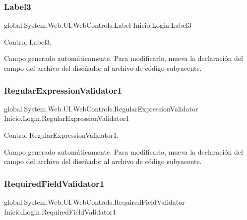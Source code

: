 \subsubsection{\texorpdfstring{Label3}{Label3}}
{\footnotesize\ttfamily global.\+System.\+Web.\+U\+I.\+Web\+Controls.\+Label Inicio.\+Login.\+Label3\hspace{0.3cm}{\ttfamily [protected]}}



Control Label3. 

Campo generado automáticamente. Para modificarlo, mueva la declaración del campo del archivo del diseñador al archivo de código subyacente. \mbox{\label{class_inicio_1_1_login_aebbbf7080d71a07e72e4be45e42c6795}} 
\subsubsection{\texorpdfstring{RegularExpressionValidator1}{RegularExpressionValidator1}}
{\footnotesize\ttfamily global.\+System.\+Web.\+U\+I.\+Web\+Controls.\+Regular\+Expression\+Validator Inicio.\+Login.\+Regular\+Expression\+Validator1\hspace{0.3cm}{\ttfamily [protected]}}



Control Regular\+Expression\+Validator1. 

Campo generado automáticamente. Para modificarlo, mueva la declaración del campo del archivo del diseñador al archivo de código subyacente. \mbox{\label{class_inicio_1_1_login_ab86e1edc9ca75591b9305e7c152beb95}} 
\subsubsection{\texorpdfstring{RequiredFieldValidator1}{RequiredFieldValidator1}}
{\footnotesize\ttfamily global.\+System.\+Web.\+U\+I.\+Web\+Controls.\+Required\+Field\+Validator Inicio.\+Login.\+Required\+Field\+Validator1\hspace{0.3cm}{\ttfamily [protected]}}



